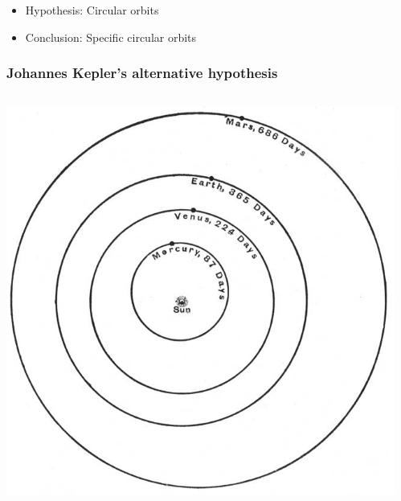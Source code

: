 \documentclass{beamer}
\begin{document}
\begin{frame}
\begin{columns}
\begin{column}{0.5\textwidth}
    \end{column}
  \end{columns}
  \begin{itemize}
  \item Hypothesis: Circular orbits
  \item Conclusion: \alert{Specific} circular orbits
  \end{itemize}
\end{frame}

\begin{frame}
  \frametitle{Johannes Kepler's alternative hypothesis}
  \begin{columns}
    \begin{column}{0.5\textwidth}
      \includegraphics[width=\columnwidth]{../figures/orbits}
    \end{column}
    \begin{column}{0.5\textwidth}

\end{column}
\end{columns}
\end{frame}
\end{document}
